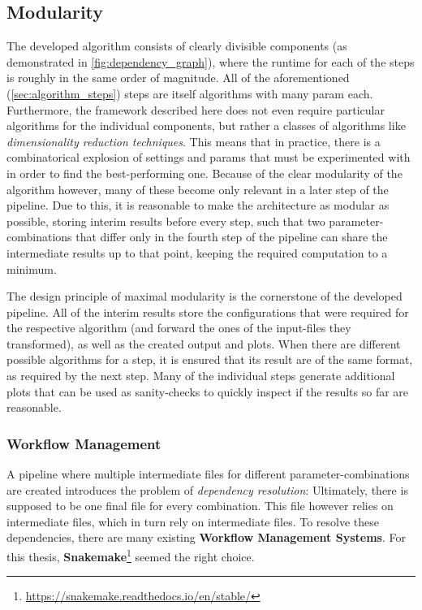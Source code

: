 \subsection{Modularity}

The developed algorithm consists of clearly divisible components (as demonstrated in \autoref{fig:dependency_graph}), where the runtime for each of the steps is roughly in the same order of magnitude. All of the aforementioned (\autoref{sec:algorithm_steps}) steps are itself algorithms with many \gls{param} each. Furthermore, the framework described here does not even require particular algorithms for the individual components, but rather a classes of algorithms like \emph{dimensionality reduction techniques}. This means that in practice, there is a combinatorical explosion of settings and \glspl{param} that must be experimented with in order to find the best-performing one. Because of the clear modularity of the algorithm however, many of these become only relevant in a later step of the pipeline. Due to this, it is reasonable to make the architecture as modular as possible, storing interim results before every step, such that two parameter-combinations that differ only in \eg the fourth step of the pipeline can share the intermediate results up to that point, keeping the required computation to a minimum. 

The design principle of maximal modularity is the cornerstone of the developed pipeline. All of the interim results store the configurations that were required for the respective algorithm (and forward the ones of the input-files they transformed), as well as the created output and plots. When there are different possible algorithms for a step, it is ensured that its result are of the same format, as required by the next step. Many of the individual steps generate additional plots that can be used as sanity-checks to quickly inspect if the results so far are reasonable.

\subsubsection{Workflow Management}

A pipeline where multiple intermediate files for different parameter-combinations are created introduces the problem of \emph{dependency resolution}: Ultimately, there is supposed to be one final file for every combination. This file however relies on intermediate files, which in turn rely on intermediate files. To resolve these dependencies, there are many existing \textbf{Workflow Management Systems}. For this thesis, \textbf{Snakemake}\footnote{\url{https://snakemake.readthedocs.io/en/stable/}} \cite{Molder2021a} seemed the right choice.

